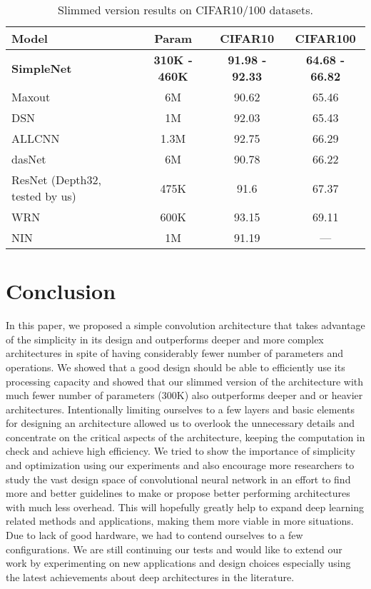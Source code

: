 \documentclass{article} \usepackage{lets_keepit_simple,times}
\begin{document}
\begin{table}[H]
	\begin{center}
\caption{Slimmed version results on CIFAR10/100 datasets.}\label{tab:Slimmed}
		\begin{tabular}{lccc}
Model & Param & CIFAR10 &CIFAR100 \\ \hline
\textbf{SimpleNet} & \textbf{310K - 460K} &\textbf{91.98 - 92.33}& \textbf{64.68 - 66.82} \\
Maxout \cite{Goodfellow_MaxoutNetwork_2013} & 6M & 90.62 & 65.46 \\
DSN \cite{Lee_DeeplySupervisedNet_2015} & 1M &  92.03 & 65.43 \\
ALLCNN \cite{Springenberg_StrivingForSimplicity_2014} & 1.3M& 92.75& 66.29 \\
dasNet \cite{stollenga_dasnet_2014} & 6M & 90.78 & 66.22 \\
ResNet \cite{He_ResNet_2015} {\tiny(Depth32, tested by us)} & 475K &  91.6 & 67.37 \\
WRN \cite{Zagoruyko_WRN_2016}  & 600K &  93.15 & 69.11 \\
NIN \cite{Lin_NIN_2013}  & 1M	&91.19 &---\\ \hline
\end{tabular}
	\end{center}
	
\end{table}

\section{Conclusion} \label{sec:conclusion}
In this paper, we proposed a simple convolution architecture that takes advantage of the simplicity in its design and outperforms deeper and more complex architectures in spite of having considerably fewer number of parameters and operations. We showed that a good design should be able to efficiently use its processing capacity and showed that our slimmed version of the architecture with much fewer number of parameters (300K) also outperforms deeper and or heavier architectures. Intentionally limiting ourselves to a few layers and basic elements for designing an architecture allowed us to overlook the unnecessary details and concentrate on the critical aspects of the architecture, keeping the computation in check and achieve high efficiency.
We tried to show the importance of simplicity and optimization using our experiments and also encourage more researchers to study the vast design space of convolutional neural network in an effort to find more and better guidelines to make or propose better performing architectures with much less overhead. This will hopefully greatly help to expand deep learning related methods and applications, making them more viable in more situations. 
Due to lack of good hardware, we had to contend ourselves to a few configurations. We are still continuing our tests and would like to extend our work by experimenting on new applications and design choices especially using the latest achievements about deep architectures in the literature.
\end{document}
